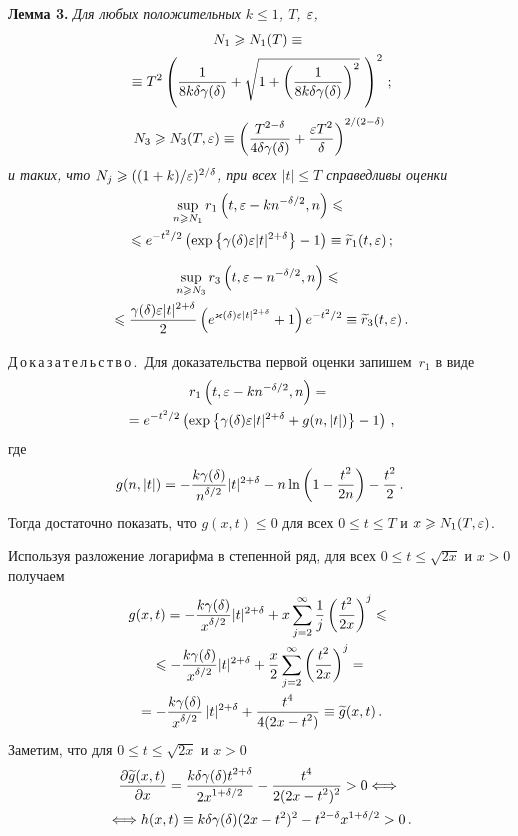 \begin{multicols}{2}
\noindent
\textbf{Лемма 3.} %
\textit{Для любых положительных $k\le1$, $T$, $\eps$,
\begin{multline*}
N_1 \ge N_1(T) \equiv{}\\
{}\equiv T^2 \left( \fr{1}{8k\d\gd} + \sqrt{1 + \left(
\fr{1}{8k\d\gd}\right)^2}\ \right)^2\,;
\end{multline*}
$$
N_3 \ge N_3(T,\eps) \equiv \left( \fr{ T^{2-\delta}}{4\d\gd} +
\fr{\eps T^2}{\delta}\right)^{2/(2-\delta)}
$$
и таких, что $N_j\ge((1+k)/\eps)^{2/\d}$, при всех $|t| \le T$
справедливы оценки}
\begin{multline*}
\sup\limits_{n\ge N_1}r_1 \left(t, \eps - kn^{-\d/2}, n \right) \le{}\\
{}\le e^{-t^2/2}
\left( \exp \left\{ \gd \eps |t|^{2+\d} \right\} - 1
\right)\equiv\widetilde r_1(t, \eps)\,;
\end{multline*}

\vspace*{-9pt}

\noindent
\begin{multline*}
\sup\limits_{n\ge N_3}r_3\left(t,\eps-n^{-\delta/2},n\right)\le{}\\
{}\le \fr{\gd \eps
|t|^{2+\delta}}{2} \left( e^{\kd\eps |t|^{2+\delta}} + 1 \right)
e^{-t^2/2}\equiv \widetilde r_3(t,\eps)\,.
\end{multline*}

\medskip

\noindent
Д\,о\,к\,а\,з\,а\,т\,е\,л\,ь\,с\,т\,в\,о\,.\
Для доказательства первой оценки запишем~$r_1$ в виде
\begin{multline*}
r_1 \left(t, \eps - kn^{-\d/2}, n \right) = {}\\
{}=e^{-t^2/2} \left( \exp
\left\{ \gd \eps |t|^{2+\d} + g(n, |t|) \right\} - 1 \right)\,,
\end{multline*}
где
$$
g(n, |t|) = -\fr{k\gd}{n^{\d/2}} |t|^{2+\d} - n \ln \left(1 -
\fr{t^2}{2n} \right) - \fr{t^2}{2}\,.
$$
Тогда достаточно показать, что $g(x, t) \le 0$ для всех $0 \le t \le
T$ и $x \ge N_1(T,\eps)$.

Используя разложение логарифма в степенной ряд, для всех $0 \le t
\le \sqrt{2x}$ и $x > 0$ получаем
\begin{multline*}
g(x, t) = -\fr{k\gd}{x^{\d/2}}|t|^{2+\d} + x
\sum\limits_{j=2}^{\infty} \fr{1}{j} \left(\fr{t^2}{2x} \right)^j
\le{}\\
{}\le
 -\fr{k\gd}{x^{\d/2}}|t|^{2+\d} + \fr{x}{2}
\sum\limits_{j=2}^{\infty} \left(\fr{t^2}{2x} \right)^j ={}
\\
{}
= -\fr{k\gd}{x^{\d/2}}\,|t|^{2+\d} + \fr{t^4}{4(2x - t^2)} \equiv
\widetilde{g}(x, t)\,.
\end{multline*}
Заметим, что для $0 \le t \le \sqrt{2x}$ и $x > 0$
\begin{multline*}
\fr{\partial \widetilde{g}(x, t)}{\partial x} = \fr{k\d\gd
t^{2+\d}}{2 x^{1+\d/2}} - \fr{t^4}{2(2x - t^2)^2} > 0
\Longleftrightarrow{} \\
{}\Longleftrightarrow h(x, t) \equiv k\d\gd(2x - t^2)^2 -
t^{2-\d} x^{1+\d/2} > 0\,.
\end{multline*}


\end{multicols}
